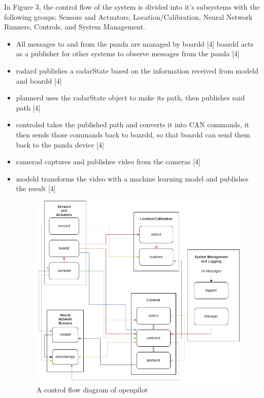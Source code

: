 \documentclass[12pt]{article}
\begin{document}
    In Figure 3, the control flow of the system is divided into it's subsystems with the following groups: Sensors and Actuators, Location/Calibration, Neural Network Runners, Controls, and System Management.

    \begin{itemize}
        \item All messages to and from the panda are managed by boardd [4]
        boardd acts as a publisher for other systems to observe messages from the panda [4]

        \item radard publishes a radarState based on the information received from modeld and boardd [4]

        \item plannerd uses the radarState object to make its path, then publishes said path [4]

        \item controlsd takes the published path and converts it into CAN commands, it then sends those commands back to boardd, so that boardd can send them back to the panda device [4]

        \item camerad captures and publishes video from the cameras [4]

        \item modeld transforms the video with a machine learning model and publishes the result [4]

        \begin{figure}[ht]
        \centering
            \includegraphics[scale=0.35]{Assets/global_control_flow.png}
            \caption{A control flow diagram of openpilot}
            \label{fig:enter-label}
        \end{figure}

    \end{itemize}
\end{document}
